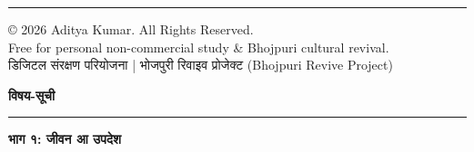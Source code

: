 \documentclass[12pt,a4paper,oneside]{article}
\begin{document}
\begin{center}
\begin{minipage}{0.88\textwidth}
  \vspace*{0.8em}
  {\color{bordercolor}\rule{\textwidth}{0.4pt}}
  \vspace*{0.8em}

  \begin{center}
    {\engfont \copyright{} 2026 Aditya Kumar. All Rights Reserved.} \\
    {\small {\engfont Free for personal non-commercial study \& Bhojpuri cultural revival.}} \\
    \vspace*{0.5em}
    {\small डिजिटल संरक्षण परियोजना | भोजपुरी रिवाइव प्रोजेक्ट {\engfont (Bhojpuri Revive Project)}}
  \end{center}
\end{minipage}
\end{center}
\vfill

\newpage
\thispagestyle{empty}

\begin{center}
  {\Large \bfseries \color{bordercolor} विषय-सूची} \\[0.4em]
  {\color{bordercolor}\rule{0.3\textwidth}{0.8pt}}
\end{center}

\vspace*{0.6cm}
\renewcommand{\contentsname}{}
\setcounter{tocdepth}{2}
\tableofcontents

\newpage
{}



\newpage
{}
\vspace*{4em}
{\centering\Huge\bfseries\color{bordercolor} भाग १: जीवन आ उपदेश\par}
\vspace*{2em}


\end{document}
